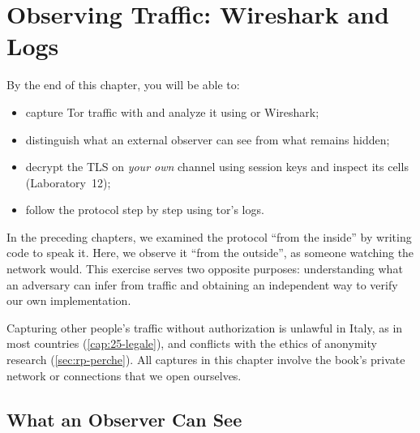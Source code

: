 \chapter{Observing Traffic: Wireshark and Logs}\label{cap:20-traffico}

\begin{obiettivi}
By the end of this chapter, you will be able to:
\begin{itemize}[nosep]
  \item capture Tor traffic with  and analyze it using  or Wireshark;
  \item distinguish what an external observer can see from what remains hidden;
  \item decrypt the TLS on \emph{your own} channel using session keys and inspect its cells (Laboratory~12);
  \item follow the protocol step by step using tor's logs.
\end{itemize}
\end{obiettivi}

In the preceding chapters, we examined the protocol \enquote{from the inside} by writing code to speak it. Here, we observe it \enquote{from the outside}, as someone watching the network would. This exercise serves two opposite purposes: understanding what an adversary can infer from traffic and obtaining an independent way to verify our own implementation.

\begin{attenzione}
Capturing other people's traffic without authorization is unlawful in Italy, as in most countries (\cref{cap:25-legale}), and conflicts with the ethics of anonymity research (\cref{sec:rp-perche}). All captures in this chapter involve the book's private network or connections that we open ourselves.
\end{attenzione}

\section{What an Observer Can See}\label{sec:traffico-osservatore}

